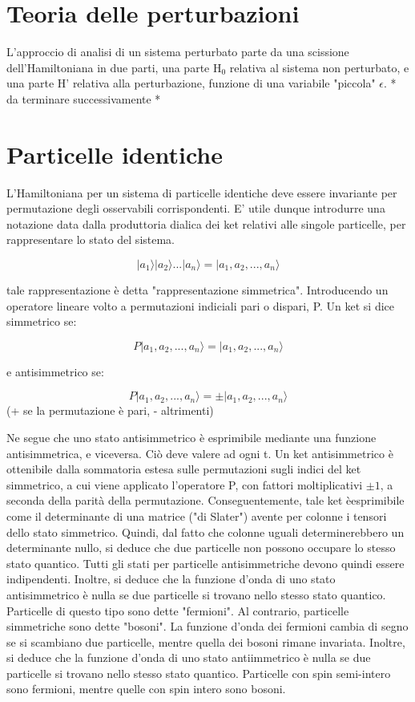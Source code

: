 \documentclass{article}
\begin{document}
\section{Teoria delle perturbazioni}
L'approccio di analisi di un sistema perturbato parte da una scissione dell'Hamiltoniana in due parti, una parte H$_0$ relativa al sistema non perturbato, e una parte H' relativa alla perturbazione, funzione di una variabile "piccola" $\epsilon$.
* da terminare successivamente *

\section{Particelle identiche}
L'Hamiltoniana per un sistema di particelle identiche deve essere invariante per permutazione degli osservabili corrispondenti.
E' utile dunque introdurre una notazione data dalla produttoria dialica dei ket relativi alle singole particelle, per rappresentare lo stato del sistema.

\begin{equation}
  |a_1\rangle |a_2\rangle ...|a_n\rangle =|a_1,a_2,...,a_n\rangle
\end{equation}

tale rappresentazione è detta "rappresentazione simmetrica".
Introducendo un operatore lineare volto a permutazioni indiciali pari o dispari, P.
Un ket si dice simmetrico se:

\begin{equation}
  P|a_1,a_2,...,a_n\rangle =|a_1,a_2,...,a_n\rangle
\end{equation}

e antisimmetrico se:

\begin{equation}
  P|a_1,a_2,...,a_n\rangle =\pm|a_1,a_2,...,a_n\rangle
\end{equation}
(+ se la permutazione è pari, - altrimenti)

Ne segue che uno stato antisimmetrico è esprimibile mediante una funzione antisimmetrica, e viceversa.
Ciò deve valere ad ogni t.
Un ket antisimmetrico è ottenibile dalla sommatoria estesa sulle permutazioni sugli indici del ket simmetrico, a cui viene applicato l'operatore P, con fattori moltiplicativi $\pm 1$, a
seconda della parità della permutazione.
Conseguentemente, tale ket èesprimibile come il determinante di una matrice ("di Slater") avente per colonne i tensori dello stato simmetrico.
Quindi, dal fatto che colonne uguali determinerebbero un determinante nullo, si deduce che due particelle non possono occupare lo stesso stato quantico.
Tutti gli stati per particelle antisimmetriche devono quindi essere indipendenti.
Inoltre, si deduce che la funzione d'onda di uno stato antisimmetrico è nulla se due particelle si trovano nello stesso stato quantico.
Particelle di questo tipo sono dette "fermioni".
Al contrario, particelle simmetriche sono dette "bosoni".
La funzione d'onda dei fermioni cambia di segno se si scambiano due particelle, mentre quella dei bosoni rimane invariata.
Inoltre, si deduce che la funzione d'onda di uno stato antiimmetrico è nulla se due particelle si trovano nello stesso stato quantico.
Particelle con spin semi-intero sono fermioni, mentre quelle con spin intero sono bosoni.
\end{document}
